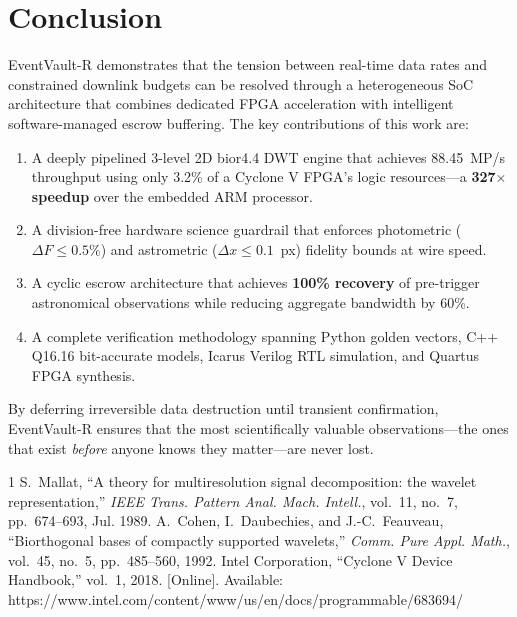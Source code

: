 \documentclass[conference]{IEEEtran}
\begin{document}
\section{Conclusion}

EventVault-R demonstrates that the tension between real-time data rates and constrained downlink budgets can be resolved through a heterogeneous SoC architecture that combines dedicated FPGA acceleration with intelligent software-managed escrow buffering. The key contributions of this work are:

\begin{enumerate}
    \item A deeply pipelined 3-level 2D bior4.4 DWT engine that achieves 88.45~MP/s throughput using only 3.2\% of a Cyclone V FPGA's logic resources---a \textbf{327$\times$ speedup} over the embedded ARM processor.
    \item A division-free hardware science guardrail that enforces photometric ($\Delta F \leq 0.5\%$) and astrometric ($\Delta x \leq 0.1$~px) fidelity bounds at wire speed.
    \item A cyclic escrow architecture that achieves \textbf{100\% recovery} of pre-trigger astronomical observations while reducing aggregate bandwidth by 60\%.
    \item A complete verification methodology spanning Python golden vectors, C++ Q16.16 bit-accurate models, Icarus Verilog RTL simulation, and Quartus FPGA synthesis.
\end{enumerate}

By deferring irreversible data destruction until transient confirmation, EventVault-R ensures that the most scientifically valuable observations---the ones that exist \textit{before} anyone knows they matter---are never lost.

\begin{thebibliography}{1}
 S.~Mallat, ``A theory for multiresolution signal decomposition: the wavelet representation,'' \textit{IEEE Trans. Pattern Anal. Mach. Intell.}, vol.~11, no.~7, pp.~674--693, Jul. 1989.
 A.~Cohen, I.~Daubechies, and J.-C.~Feauveau, ``Biorthogonal bases of compactly supported wavelets,'' \textit{Comm. Pure Appl. Math.}, vol.~45, no.~5, pp.~485--560, 1992.
 Intel Corporation, ``Cyclone V Device Handbook,'' vol.~1, 2018. [Online]. Available: https://www.intel.com/content/www/us/en/docs/programmable/683694/
\end{thebibliography}
\end{document}
